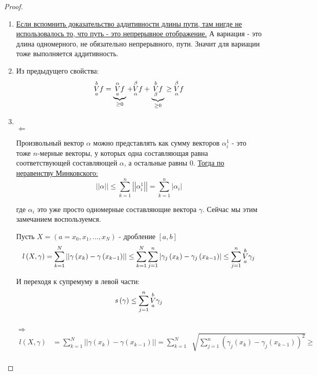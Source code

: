 \documentclass[../main.tex]{subfiles}
\begin{document}
\begin{proof}
    
    ~

    \begin{enumerate}
        \item \hyperlink{thm:path_add}{Если вспомнить доказательство аддитивности длины пути, там нигде не использовалось то, что путь - это непрерывное отображение.} А вариация - это длина одномерного, не обязательно непрерывного, пути. Значит для вариации тоже выполняется аддитивность. 
        \item Из предыдущего свойства:
        \[ \underset{ a }{\overset{ b }{V}} f= \underbrace{\underset{ a}{\overset{ \alpha }{V}} f}_{ \geq 0}+ \underset{ \alpha }{\overset{ \beta }{V}} f + \underbrace{\underset{ \beta }{\overset{ b}{V}} f}_{ \geq 0} \geq \underset{ \alpha }{\overset{ \beta }{V}} f\]
        \item ~\\
        \( \boxed{ \Longleftarrow}\)
        \par Произвольный вектор \( \alpha  \) можно представлять как сумму векторов \( \alpha  _i^1\) - это тоже \( n\)-мерные векторы, у которых одна составляющая равна соответствующей составляющей \( \alpha  \), а остальные равны \( 0\). \hyperlink{thm:minkovsky}{Тогда по неравенству Минковского:}
        \[ \left| \left| \alpha  \right|\right| \leq \sum\limits_{ k=1}^{ n} \left| \left| \alpha  _i^1\right|\right| = \sum\limits_{ k=1}^{ n} \left|  \alpha  _i\right|\]
        \par где \( \alpha  _i\) это уже просто одномерные составляющие вектора \( \gamma \). Сейчас мы этим замечанием воспользуемся. 
        \par Пусть \( X=\left( a=x_0, x_1, \ldots , x_N\right)\) - дробление \( \left[ a,b\right]\)
        \[ l \left( X, \gamma \right)= \sum\limits_{ k=1}^{ N} \left| \left| \gamma \left( x_k\right)- \gamma \left( x_{k-1}\right)\right|\right| \leq \sum\limits_{ k=1}^{ N} \sum\limits_{ j=1}^{ n} \left| \gamma _j \left( x_k\right)- \gamma _j \left( x_{k-1}\right)\right| \leq  \sum\limits_{ j=1}^{ n} \underset{ a}{\overset{ b}{V}} \gamma _j\]
        \par И переходя к супремуму в левой части:
        \[ s \left( \gamma \right) \leq \sum\limits_{ j=1}^{ n} \underset{ a}{\overset{ b}{V}} \gamma _j\]\\
        \( \boxed{\Longrightarrow}\)
        \begin{equation*}
            \begin{aligned}
                l \left( X, \gamma \right)&= \sum\limits_{ k=1}^{ N} \left| \left| \gamma \left( x_k\right)- \gamma \left( x_{k-1}\right)\right|\right|= \sum\limits_{ k=1}^{ N} \;\sqrt[]{ \sum\limits_{ j=1}^{ n} \left( \gamma _j \left( x_k\right)- \gamma _j \left( x_{k-1}\right)\right)^2} \geq \\

\end{aligned}
\end{equation*}
\end{enumerate}
\end{proof}
\end{document}
